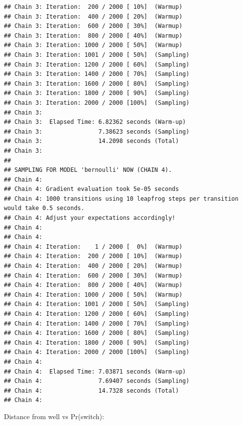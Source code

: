 \documentclass[
]{article}
\begin{document}
\begin{verbatim}
## Chain 3: Iteration:  200 / 2000 [ 10%]  (Warmup)
## Chain 3: Iteration:  400 / 2000 [ 20%]  (Warmup)
## Chain 3: Iteration:  600 / 2000 [ 30%]  (Warmup)
## Chain 3: Iteration:  800 / 2000 [ 40%]  (Warmup)
## Chain 3: Iteration: 1000 / 2000 [ 50%]  (Warmup)
## Chain 3: Iteration: 1001 / 2000 [ 50%]  (Sampling)
## Chain 3: Iteration: 1200 / 2000 [ 60%]  (Sampling)
## Chain 3: Iteration: 1400 / 2000 [ 70%]  (Sampling)
## Chain 3: Iteration: 1600 / 2000 [ 80%]  (Sampling)
## Chain 3: Iteration: 1800 / 2000 [ 90%]  (Sampling)
## Chain 3: Iteration: 2000 / 2000 [100%]  (Sampling)
## Chain 3: 
## Chain 3:  Elapsed Time: 6.82362 seconds (Warm-up)
## Chain 3:                7.38623 seconds (Sampling)
## Chain 3:                14.2098 seconds (Total)
## Chain 3: 
## 
## SAMPLING FOR MODEL 'bernoulli' NOW (CHAIN 4).
## Chain 4: 
## Chain 4: Gradient evaluation took 5e-05 seconds
## Chain 4: 1000 transitions using 10 leapfrog steps per transition would take 0.5 seconds.
## Chain 4: Adjust your expectations accordingly!
## Chain 4: 
## Chain 4: 
## Chain 4: Iteration:    1 / 2000 [  0%]  (Warmup)
## Chain 4: Iteration:  200 / 2000 [ 10%]  (Warmup)
## Chain 4: Iteration:  400 / 2000 [ 20%]  (Warmup)
## Chain 4: Iteration:  600 / 2000 [ 30%]  (Warmup)
## Chain 4: Iteration:  800 / 2000 [ 40%]  (Warmup)
## Chain 4: Iteration: 1000 / 2000 [ 50%]  (Warmup)
## Chain 4: Iteration: 1001 / 2000 [ 50%]  (Sampling)
## Chain 4: Iteration: 1200 / 2000 [ 60%]  (Sampling)
## Chain 4: Iteration: 1400 / 2000 [ 70%]  (Sampling)
## Chain 4: Iteration: 1600 / 2000 [ 80%]  (Sampling)
## Chain 4: Iteration: 1800 / 2000 [ 90%]  (Sampling)
## Chain 4: Iteration: 2000 / 2000 [100%]  (Sampling)
## Chain 4: 
## Chain 4:  Elapsed Time: 7.03871 seconds (Warm-up)
## Chain 4:                7.69407 seconds (Sampling)
## Chain 4:                14.7328 seconds (Total)
## Chain 4:
\end{verbatim}

Distance from well vs Pr(switch):
\end{document}
